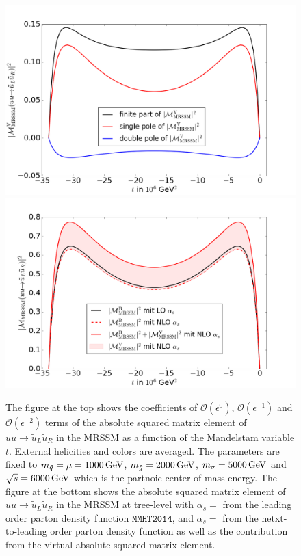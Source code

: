 \begin{figure}[!htpb]
\begin{center}
\includegraphics[scale=.5]{figures/MatrixElement_Poles.png}
\includegraphics[scale=.5]{figures/MatrixElement.png}
\caption{The figure at the top shows the coefficients of $\mathcal{O}(\epsilon^0)$, $\mathcal{O}(\epsilon^{-1})$ and $\mathcal{O}(\epsilon^{-2})$ terms of the absolute squared matrix element of $uu \to \tilde{u}_L\tilde{u}_R$ in the MRSSM as a function of the Mandelstam variable $t$. External helicities and colors are averaged. The parameters are fixed to $m_{\tilde{q}} = \mu = \unit[1000]{GeV}$, $m_{\tilde{g}} = \unit[2000]{GeV}$, $m_{\sigma} = \unit[5000]{GeV}$ and $\sqrt{s} = \unit[6000]{GeV}$ which is the partnoic center of mass energy.\newline
The figure at the bottom shows the absolute squared matrix element of $uu \to \tilde{u}_L\tilde{u}_R$ in the MRSSM at tree-level with $\alpha_s = $ from the leading order parton density function $\mathtt{MMHT2014}$\cite{Harland-Lang:2014zoa}, and $\alpha_s = $ from the netxt-to-leading order parton density function as well as the contribution from the virtual absolute squared matrix element.}\label{fig:MatrixElement}
\end{center}
\end{figure}